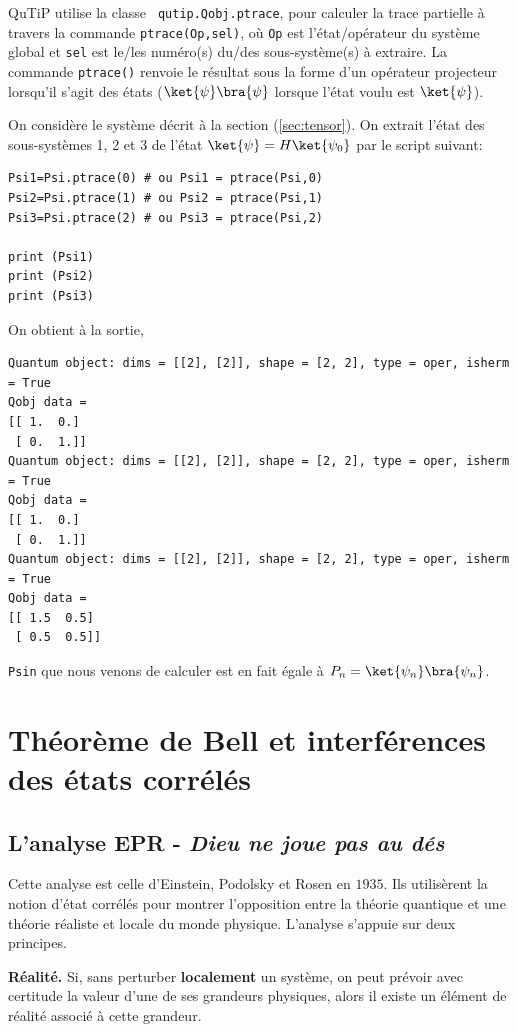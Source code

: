 QuTiP utilise la classe \texttt{ qutip.Qobj.ptrace}, pour calculer la trace 
partielle à travers la commande \texttt{ptrace(Op,sel)}, où \texttt{Op} est 
l'état/opérateur du système global et \texttt{sel} est le/les numéro(s) du/des 
sous-système(s) à extraire. La commande \texttt{ptrace()} renvoie le résultat 
sous la forme d'un opérateur projecteur lorsqu'il s'agit des états 
($\ket{\psi}\bra{\psi}$ lorsque l'état voulu est $\ket{\psi}$).

On considère le système décrit à la section (\ref{sec:tensor}). On extrait 
l'état des sous-systèmes 1, 2 et 3 de l'état $\ket{\psi}=H\ket{\psi_0}$ par le 
script suivant:\\
\begin{lstlisting}
Psi1=Psi.ptrace(0) # ou Psi1 = ptrace(Psi,0)
Psi2=Psi.ptrace(1) # ou Psi2 = ptrace(Psi,1)
Psi3=Psi.ptrace(2) # ou Psi3 = ptrace(Psi,2)

print (Psi1)
print (Psi2)
print (Psi3)
\end{lstlisting}
On obtient à la sortie,
\begin{lstlisting}
Quantum object: dims = [[2], [2]], shape = [2, 2], type = oper, isherm = True
Qobj data =
[[ 1.  0.]
 [ 0.  1.]]
Quantum object: dims = [[2], [2]], shape = [2, 2], type = oper, isherm = True
Qobj data =
[[ 1.  0.]
 [ 0.  1.]]
Quantum object: dims = [[2], [2]], shape = [2, 2], type = oper, isherm = True
Qobj data =
[[ 1.5  0.5]
 [ 0.5  0.5]]
\end{lstlisting}

\texttt{Psin} que nous venons de calculer est en fait égale à 
$P_n=\ket{\psi_n}\bra{\psi_n}$.


\section{Théorème de Bell et interférences des états corrélés}
\label{sec:Bell}

\subsection{L'analyse EPR - \emph{Dieu ne joue pas au dés}}

Cette analyse est celle d'Einstein, Podolsky et Rosen en $1935$. Ils utilisèrent
la notion d'état corrélés pour montrer l'opposition entre la théorie quantique
et une théorie réaliste et locale du monde physique. L'analyse s'appuie sur deux
principes.

\begin{principe}
 \textbf{Réalité.} Si, sans perturber \textbf{localement} un système, on peut
prévoir avec certitude la valeur d'une de ses grandeurs physiques, alors il
existe un élément de réalité associé à cette grandeur.
\end{principe}

